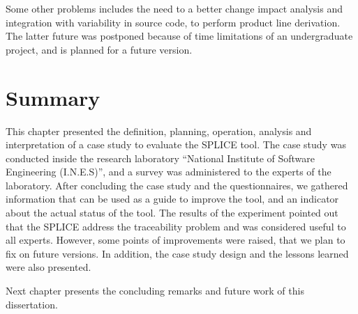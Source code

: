 Some other problems includes the need to a better change impact analysis and integration with variability in source code, to perform product line derivation. The latter future was postponed because of time limitations of an undergraduate project, and is planned for a future version.


\section{Summary}
\label{sc:expsummary}

This chapter presented the definition, planning, operation, analysis and interpretation of a case study to evaluate the \ac{SPLICE} tool. The case study was conducted inside the research laboratory “National Institute of Software Engineering (I.N.E.S)”, and a survey was administered to the experts of the laboratory.
After concluding the case study and the questionnaires, we gathered information that can be used as a guide to improve the tool, and an indicator about the actual status of the tool. The results of the experiment pointed out that the \ac{SPLICE} address the traceability problem and was considered useful to all experts. However, some points of improvements were raised, that we plan to fix on future versions. In addition, the case study design and the lessons learned were also presented.

Next chapter presents the concluding remarks and future work of this dissertation.




